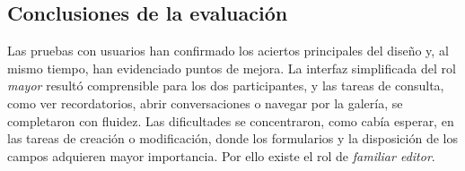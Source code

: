 \subsection{Conclusiones de la
evaluación\label{SUB:AIPO_CONCLUSIONES}}

Las pruebas con usuarios han confirmado los aciertos principales del diseño
y, al mismo tiempo, han evidenciado puntos de mejora. La interfaz simplificada del rol \emph{mayor} resultó
comprensible para los dos participantes, y las tareas
de consulta, como ver recordatorios, abrir conversaciones o navegar por la
galería, se completaron con fluidez. Las dificultades se concentraron, como
cabía esperar, en las tareas de creación o modificación, donde los
formularios y la disposición de los campos adquieren mayor importancia. Por ello existe el rol de \emph{familiar editor}.